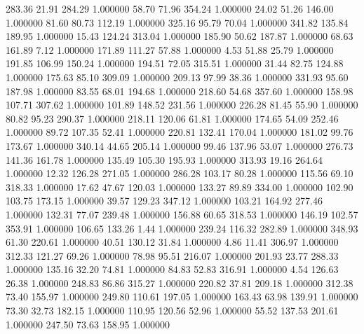     283.36     21.91    284.29  1.000000
     58.70     71.96    354.24  1.000000
     24.02     51.26    146.00  1.000000
     81.60     80.73    112.19  1.000000
    325.16     95.79     70.04  1.000000
    341.82    135.84    189.95  1.000000
     15.43    124.24    313.04  1.000000
    185.90     50.62    187.87  1.000000
     68.63    161.89      7.12  1.000000
    171.89    111.27     57.88  1.000000
      4.53     51.88     25.79  1.000000
    191.85    106.99    150.24  1.000000
    194.51     72.05    315.51  1.000000
     31.44     82.75    124.88  1.000000
    175.63     85.10    309.09  1.000000
    209.13     97.99     38.36  1.000000
    331.93     95.60    187.98  1.000000
     83.55     68.01    194.68  1.000000
    218.60     54.68    357.60  1.000000
    158.98    107.71    307.62  1.000000
    101.89    148.52    231.56  1.000000
    226.28     81.45     55.90  1.000000
     80.82     95.23    290.37  1.000000
    218.11    120.06     61.81  1.000000
    174.65     54.09    252.46  1.000000
     89.72    107.35     52.41  1.000000
    220.81    132.41    170.04  1.000000
    181.02     99.76    173.67  1.000000
    340.14     44.65    205.14  1.000000
     99.46    137.96     53.07  1.000000
    276.73    141.36    161.78  1.000000
    135.49    105.30    195.93  1.000000
    313.93     19.16    264.64  1.000000
     12.32    126.28    271.05  1.000000
    286.28    103.17     80.28  1.000000
    115.56     69.10    318.33  1.000000
     17.62     47.67    120.03  1.000000
    133.27     89.89    334.00  1.000000
    102.90    103.75    173.15  1.000000
     39.57    129.23    347.12  1.000000
    103.21    164.92    277.46  1.000000
    132.31     77.07    239.48  1.000000
    156.88     60.65    318.53  1.000000
    146.19    102.57    353.91  1.000000
    106.65    133.26      1.44  1.000000
    239.24    116.32    282.89  1.000000
    348.93     61.30    220.61  1.000000
     40.51    130.12     31.84  1.000000
      4.86     11.41    306.97  1.000000
    312.33    121.27     69.26  1.000000
     78.98     95.51    216.07  1.000000
    201.93     23.77    288.33  1.000000
    135.16     32.20     74.81  1.000000
     84.83     52.83    316.91  1.000000
      4.54    126.63     26.38  1.000000
    248.83     86.86    315.27  1.000000
    220.82     37.81    209.18  1.000000
    312.38     73.40    155.97  1.000000
    249.80    110.61    197.05  1.000000
    163.43     63.98    139.91  1.000000
     73.30     32.73    182.15  1.000000
    110.95    120.56     52.96  1.000000
     55.52    137.53    201.61  1.000000
    247.50     73.63    158.95  1.000000
